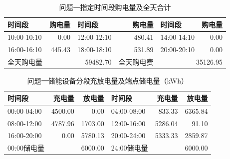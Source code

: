 \begin{table}[H]\centering\small
\caption{问题一指定时间段购电量及全天合计}
\begin{tabular}{lrlrlr}\toprule
时间段 & 购电量 & 时间段 & 购电量 & 时间段 & 购电量 \\\midrule
10:00-10:10 & 0.00 & 12:00-12:10 & 480.41 & 14:00-14:10 & 0.00\\
16:00-16:10 & 445.43 & 18:00-18:10 & 531.89 & 20:00-20:10 & 0.00\\
\midrule 全天购电量 & \multicolumn{2}{r}{59482.70} & 全天购电费 & \multicolumn{2}{r}{35126.95}\\\bottomrule
\end{tabular}\end{table}
\begin{table}[H]\centering\small
\caption{问题一储能设备分段充放电量及端点储电量（kWh）}
\begin{tabular}{lrrlrr}\toprule
时间段 & 充电量 & 放电量 & 时间段 & 充电量 & 放电量 \\\midrule
00:00-04:00 & 4500.00 & 0.00 & 04:00-08:00 & 833.33 & 6365.84\\
08:00-12:00 & 4787.96 & 1703.00 & 12:00-16:00 & 5286.04 & 91.10\\
16:00-20:00 & 0.00 & 5780.13 & 20:00-24:00 & 5333.33 & 2859.87\\
\midrule 00:00储电量 & \multicolumn{2}{r}{6000.00} & 24:00储电量 & \multicolumn{2}{r}{6000.00}\\\bottomrule
\end{tabular}\end{table}
